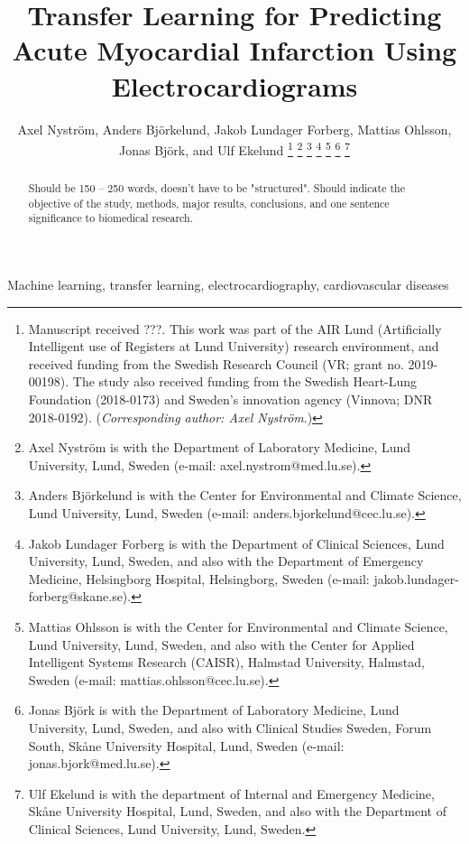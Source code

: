 \documentclass[journal,twoside,web]{ieeecolor}
\begin{document}
\title{Transfer Learning for Predicting Acute Myocardial Infarction Using Electrocardiograms}
\author{Axel Nyström, Anders Björkelund, Jakob Lundager Forberg, Mattias Ohlsson, Jonas Björk, and Ulf Ekelund
\thanks{Manuscript received ???. This work was part of the AIR Lund (Artificially Intelligent use of Registers at Lund University) research environment, and received funding from the Swedish Research Council (VR; grant no. 2019-00198). The study also received funding from the Swedish Heart-Lung Foundation (2018-0173) and Sweden's innovation agency (Vinnova; DNR 2018-0192). (\textit{Corresponding author: Axel Nyström}.)}
\thanks{Axel Nyström is with the Department of Laboratory Medicine, Lund University, Lund, Sweden (e-mail: axel.nystrom@med.lu.se).}
\thanks{Anders Björkelund is with the Center for Environmental and Climate Science, Lund University, Lund, Sweden (e-mail: anders.bjorkelund@cec.lu.se).}
\thanks{Jakob Lundager Forberg is with the Department of Clinical Sciences, Lund University, Lund, Sweden, and also with the Department of Emergency Medicine, Helsingborg Hospital, Helsingborg, Sweden (e-mail: jakob.lundager-forberg@skane.se).}
\thanks{Mattias Ohlsson is with the Center for Environmental and Climate Science, Lund University, Lund, Sweden, and also with the Center for Applied Intelligent Systems Research (CAISR), Halmstad University, Halmstad, Sweden (e-mail: mattias.ohlsson@cec.lu.se).}
\thanks{Jonas Björk is with the Department of Laboratory Medicine, Lund University, Lund, Sweden, and also with Clinical Studies Sweden, Forum South, Skåne University Hospital, Lund, Sweden (e-mail: jonas.bjork@med.lu.se).}
\thanks{Ulf Ekelund is with the department of Internal and Emergency Medicine, Skåne University Hospital, Lund, Sweden, and also with the Department of Clinical Sciences, Lund University, Lund, Sweden.}
}

\maketitle

\begin{abstract}
Should be 150 -- 250 words, doesn't have to be "structured". Should indicate the objective of the study, methods, major results, conclusions, and one sentence significance to biomedical research.
\end{abstract}

\begin{IEEEkeywords}
Machine learning, transfer learning, electrocardiography, cardiovascular diseases
\end{IEEEkeywords}
\end{document}
